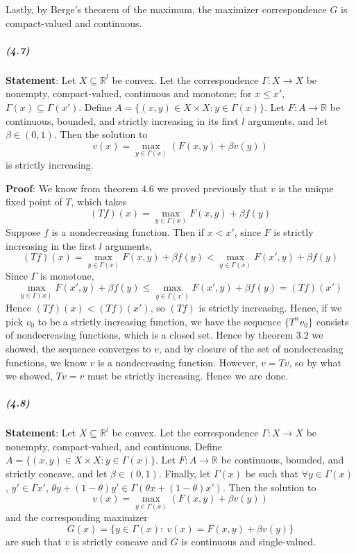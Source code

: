 \documentclass[10pt,letter]{article}
\begin{document}
Lastly, by Berge's theorem of the maximum, the maximizer correspondence $G$ is compact-valued and continuous.
\subparagraph{(4.7)} \textbf{Statement}: Let $X \subseteq \mathbb{R}^l$ be convex. Let the correspondence $\Gamma:X \to X$ be nonempty, compact-valued, continuous and monotone; for $x \le x'$, $\Gamma(x) \subseteq \Gamma(x')$. Define $A = \{(x,y)\in X \times X : y \in \Gamma(x) \}$. Let $F: A \to \mathbb{R}$ be continuous, bounded, and strictly increasing in its first $l$ arguments, and let $\beta \in (0,1)$. Then the solution to
\[ v(x) = \max_{y \in \Gamma(x)}(F(x,y)+ \beta v(y)) \]
is strictly increasing.

\textbf{Proof}: We know from theorem $4.6$ we proved previously that $v$ is the unique fixed point of $T$, which takes
\[(Tf)(x) = \max_{y \in \Gamma(x)} F(x,y) + \beta f(y) \]
Suppose $f$ is a nondecreasing function. Then if $x < x'$, since $F$ is strictly increasing in the first $l$ arguments,
\[ (Tf)(x) = \max_{y \in \Gamma(x)} F(x,y) + \beta f(y) < \max_{y \in \Gamma(x)} F(x',y) + \beta f(y)\]
Since $\Gamma$ is monotone,
\[ \max_{y \in \Gamma(x)} F(x',y) + \beta f(y) \le \max_{y \in \Gamma(x')} F(x',y) + \beta f(y) = (Tf)(x') \]
Hence $(Tf)(x) < (Tf)(x')$, so $(Tf)$ is strictly increasing. Hence, if we pick $v_0$ to be a strictly increasing function, we have the sequence $\{ T^n v_0 \}$ consists of nondecreasing functions, which is a closed set. Hence by theorem 3.2 we showed, the sequence converges to $v$, and by closure of the set of nondecreasing functions, we know $v$ is a nondecreasing function. However, $v = Tv$, so by what we showed, $Tv = v$ must be strictly increasing. Hence we are done.

\subparagraph{(4.8)} \textbf{Statement}: Let $X \subseteq \mathbb{R}^l$ be convex. Let the correspondence $\Gamma:X \to X$ be nonempty, compact-valued, and continuous. Define $A = \{(x,y)\in X \times X : y \in \Gamma(x) \}$. Let $F: A \to \mathbb{R}$ be continuous, bounded, and strictly concave, and let $\beta \in (0,1)$. Finally, let $\Gamma(x)$ be such that $\forall y \in \Gamma(x)$, $y'\in\Gamma x'$, $\theta y + (1-\theta)y' \in \Gamma(\theta x + (1-\theta)x')$. Then the solution to
\[ v(x) = \max_{y \in \Gamma(x)}(F(x,y)+ \beta v(y)) \]
and the corresponding maximizer
\[ G(x) = \{ y \in \Gamma(x) : \ v(x) = F(x,y) + \beta v(y) \} \]
are such that $v$ is strictly concave and $G$ is continuous and single-valued.
\end{document}
